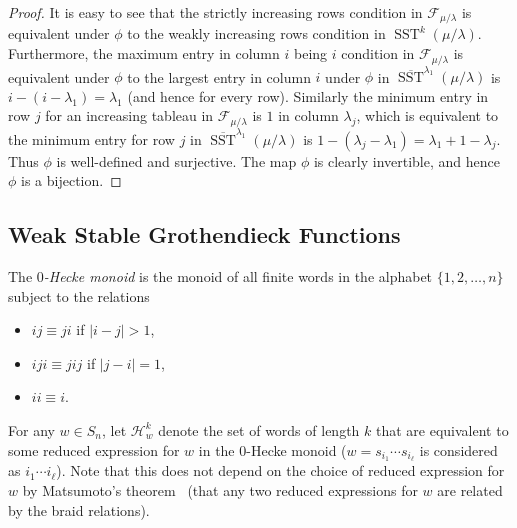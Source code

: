 \documentclass[ALCO,ThmDefs,Unicode,epreuves]{cedram}
\newcommand{\HH}{\mathcal{H}}
\newcommand{\sym}{S}
\DeclareMathOperator{\ssyt}{SST} %
\newcommand{\mcF}{\mathcal{F}}
\newcommand{\defn}[1]{{\color{darkred}\emph{#1}}} %
\begin{document}
\begin{proof}
It is easy to see that the strictly increasing rows condition in $\mcF_{\mu/\lambda}$ is equivalent under $\phi$ to the weakly increasing rows condition in $\ssyt^k(\mu/\lambda)$. Furthermore, the maximum entry in column $i$ being $i$ condition in $\mcF_{\mu/\lambda}$ is equivalent under $\phi$ to the largest entry in column $i$ under $\phi$ in $\overline{\ssyt}^{\lambda_1}(\mu/\lambda)$ is $i - (i-\lambda_1) = \lambda_1$ (and hence for every row). Similarly the minimum entry in row $j$ for an increasing tableau in $\mcF_{\mu/\lambda}$ is $1$ in column $\lambda_j$, which is equivalent to the minimum entry for row $j$ in $\overline{\ssyt}^{\lambda_1}(\mu/\lambda)$ is $1 - (\lambda_j - \lambda_1) = \lambda_1 + 1 - \lambda_j$.
Thus $\phi$ is well-defined and surjective.
The map $\phi$ is clearly invertible, and hence $\phi$ is a bijection.
\end{proof}


\subsection{Weak Stable Grothendieck Functions}
\label{sec:weak_stable}

The \defn{$0$-Hecke monoid} is the monoid of all finite words in the alphabet $\{1,2,\dotsc,n\}$ subject to the relations
\begin{itemize}
\item $ij \equiv ji$ if $|i-j|>1$,
\item $iji \equiv jij$ if $|j-i|=1$,
\item $ii \equiv i$.
\end{itemize}
For any $w \in \sym_n$, let $\HH_w^k$ denote the set of words of length $k$ that are equivalent to some reduced expression for $w$ in the $0$-Hecke monoid (\ie $w = s_{i_1} \dotsm s_{i_{\ell}}$ is considered as $i_1 \dotsm i_{\ell}$).
Note that this does not depend on the choice of reduced expression for $w$ by Matsumoto's theorem~\cite{Matsumoto64} (\ie that any two reduced expressions for $w$ are related by the braid relations).
\end{document}
